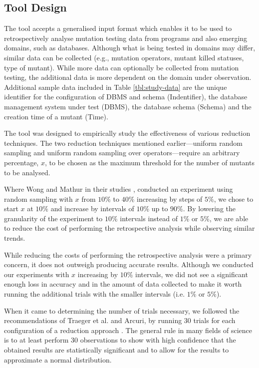 \subsection{Tool Design}

The \mr tool accepts a generalised input format which enables it to be used to retrospectively analyse mutation testing
data from programs and also emerging domains, such as databases. Although what is being tested in domains may differ,
similar data can be collected (e.g., mutation operators, mutant killed statuses, type of mutant). While more data
can optionally be collected from mutation testing, the additional data is more
dependent on the domain under observation. Additional sample data included in Table \ref{tbl:study-data} are
the unique identifier for the configuration of DBMS and schema (Indentifier),
the database management system under test (DBMS), the database schema (Schema) and the creation time of a mutant (Time).

The \mr tool was designed to empirically study the effectiveness of
various reduction techniques. The two reduction techniques mentioned earlier---uniform random sampling
and uniform random sampling over operators---require an arbitrary percentage, $x$, to be chosen as the maximum threshold
for the number of mutants to be analysed.

Where Wong and Mathur in their studies \cite{mathur1994empirical}, \cite{wong1993mutation} conducted
an experiment using random sampling with $x$ from $10\%$ to $40\%$ increasing by steps of $5\%$, we
chose to start $x$ at $10\%$ and increase by intervals of $10\%$ up to $90\%$. By lowering
the granularity of the experiment to $10\%$ intervals instead of
$1\%$ or $5\%$, we are able to reduce the cost of performing the retrospective analysis while observing
similar trends.

While reducing the costs of performing the retrospective analysis were a primary concern, it does not
outweigh producing accurate results. Although we conducted our experiments with $x$ increasing by
$10\%$ intervals, we did not see a significant enough loss in accuracy and in the amount of data collected to make
it worth running the additional trials with the smaller intervals (i.e. $1\%$ or $5\%$).

When it came to determining the number of trials necessary, we followed
the recommendations of Traeger et al. and Arcuri, by running 30 trials for each configuration of a reduction approach \cite{traeger2008nine, arcuri2014hitchhiker}.
The general rule in many fields of science is to at least perform 30 observations to show with high confidence
that the obtained results are statistically significant and to allow for the results to approximate a normal
distribution.

% 

